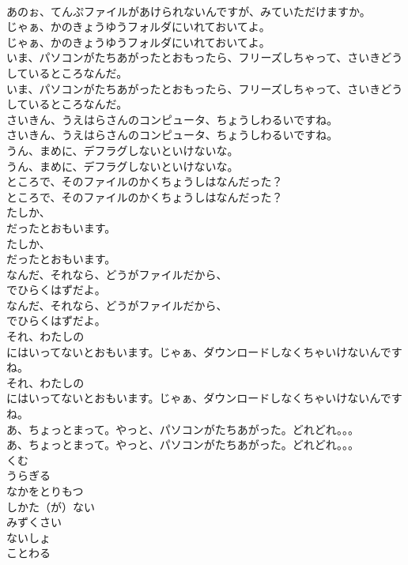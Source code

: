 \documentclass[8pt]{extreport}
\begin{document}
\begin{CJK}{UTF8}{min}
\\	あのぉ、てんぷファイルがあけられないんですが、みていただけますか。 
\\	じゃぁ、かのきょうゆうフォルダにいれておいてよ。	
\\	じゃぁ、かのきょうゆうフォルダにいれておいてよ。 
\\	いま、パソコンがたちあがったとおもったら、フリーズしちゃって、さいきどうしているところなんだ。	
\\	いま、パソコンがたちあがったとおもったら、フリーズしちゃって、さいきどうしているところなんだ。 
\\	さいきん、うえはらさんのコンピュータ、ちょうしわるいですね。	
\\	さいきん、うえはらさんのコンピュータ、ちょうしわるいですね。 
\\	うん、まめに、デフラグしないといけないな。	
\\	うん、まめに、デフラグしないといけないな。 
\\	ところで、そのファイルのかくちょうしはなんだった？	
\\	ところで、そのファイルのかくちょうしはなんだった？ 
\\	たしか、
\\	だったとおもいます。	
\\	たしか、
\\	だったとおもいます。 
\\	なんだ、それなら、どうがファイルだから、
\\	でひらくはずだよ。	
\\	なんだ、それなら、どうがファイルだから、
\\	でひらくはずだよ。 
\\	それ、わたしの
\\	にはいってないとおもいます。じゃぁ、ダウンロードしなくちゃいけないんですね。	
\\	それ、わたしの
\\	にはいってないとおもいます。じゃぁ、ダウンロードしなくちゃいけないんですね。 
\\	あ、ちょっとまって。やっと、パソコンがたちあがった。どれどれ。。。	
\\	あ、ちょっとまって。やっと、パソコンがたちあがった。どれどれ。。。 
\\	くむ
\\	うらぎる
\\	なかをとりもつ
\\	しかた（が）ない
\\	みずくさい
\\	ないしょ
\\	ことわる

\end{CJK}
\end{document}
